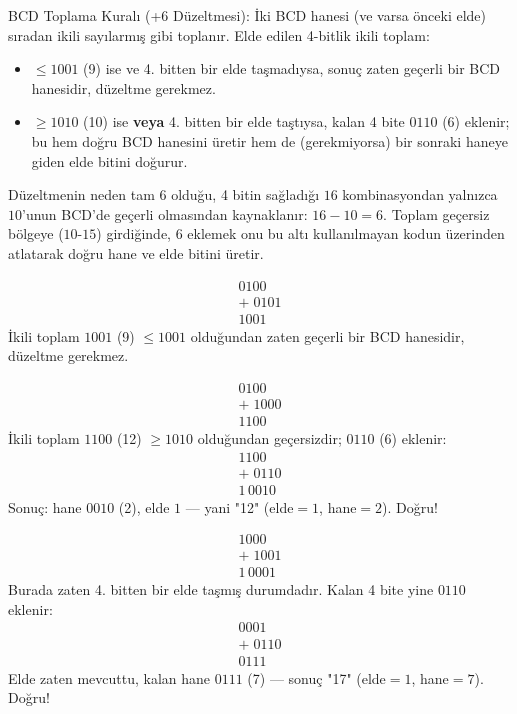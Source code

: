 \begin{tanim}{BCD Toplama Kuralı (+6 Düzeltmesi):}
İki BCD hanesi (ve varsa önceki elde) sıradan ikili sayılarmış gibi toplanır. Elde edilen
4-bitlik ikili toplam:
\begin{itemize}[nosep, leftmargin=*]
    \item $\le1001$ (9) ise ve 4. bitten bir elde taşmadıysa, sonuç zaten geçerli bir BCD
    hanesidir, düzeltme gerekmez.
    \item $\ge1010$ (10) ise \textbf{veya} 4. bitten bir elde taştıysa, kalan 4 bite $0110$
    (6) eklenir; bu hem doğru BCD hanesini üretir hem de (gerekmiyorsa) bir sonraki haneye
    giden elde bitini doğurur.
\end{itemize}
Düzeltmenin neden tam $6$ olduğu, 4 bitin sağladığı $16$ kombinasyondan yalnızca $10$'unun
BCD'de geçerli olmasından kaynaklanır: $16-10=6$. Toplam geçersiz bölgeye ($10$-$15$)
girdiğinde, $6$ eklemek onu bu altı kullanılmayan kodun üzerinden atlatarak doğru hane ve
elde bitini üretir.
\end{tanim}

\begin{ornek}
\[
\begin{array}{r}
0100 \\
+\;0101 \\
\hline
1001
\end{array}
\]
İkili toplam $1001$ (9) $\le1001$ olduğundan zaten geçerli bir BCD hanesidir, düzeltme
gerekmez.
\end{ornek}

\begin{ornek}
\[
\begin{array}{r}
0100 \\
+\;1000 \\
\hline
1100
\end{array}
\]
İkili toplam $1100$ (12) $\ge1010$ olduğundan geçersizdir; $0110$ (6) eklenir:
\[
\begin{array}{r}
1100 \\
+\;0110 \\
\hline
1\,0010
\end{array}
\]
Sonuç: hane $0010$ (2), elde $1$ --- yani "12" (elde$=1$, hane$=2$). Doğru!
\end{ornek}

\begin{ornek}
\[
\begin{array}{r}
1000 \\
+\;1001 \\
\hline
1\,0001
\end{array}
\]
Burada zaten 4. bitten bir elde taşmış durumdadır. Kalan 4 bite yine $0110$ eklenir:
\[
\begin{array}{r}
0001 \\
+\;0110 \\
\hline
0111
\end{array}
\]
Elde zaten mevcuttu, kalan hane $0111$ (7) --- sonuç "17" (elde$=1$, hane$=7$). Doğru!
\end{ornek}

